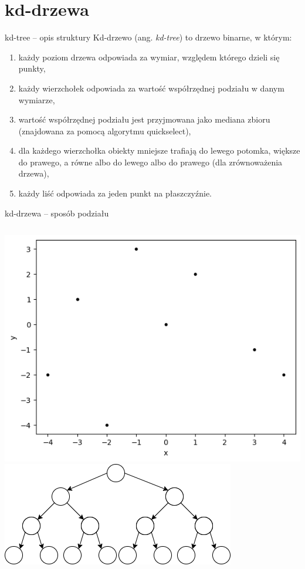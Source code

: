 \documentclass[aspectratio=169,dvipsnames]{beamer}
\begin{document}
\section{kd-drzewa}

\begin{frame}{kd-tree -- opis struktury}
    Kd-drzewo (ang. \textit{kd-tree}) to drzewo binarne, w którym:
    \begin{enumerate}
        \item<2-> każdy poziom drzewa odpowiada za wymiar, względem którego dzieli się punkty,
        \item<3-> każdy wierzchołek odpowiada za wartość współrzędnej podziału w danym wymiarze,
        \item<4-> wartość współrzędnej podziału jest przyjmowana jako mediana zbioru (znajdowana za pomocą algorytmu quickselect),
        \item<5-> dla każdego wierzchołka obiekty mniejsze trafiają do lewego potomka, większe do prawego, a równe albo do lewego albo do prawego (dla zrównoważenia drzewa),
        \item<6-> każdy liść odpowiada za jeden punkt na płaszczyźnie.
    \end{enumerate}
\end{frame}

\begin{frame}{kd-drzewa -- sposób podziału}
    \begin{columns}
        \includegraphics[width=\textwidth]{images/plots/1}
        \includegraphics[width=\textwidth]{images/trees/1.drawio}
    \end{columns}
\end{frame}
\end{document}
